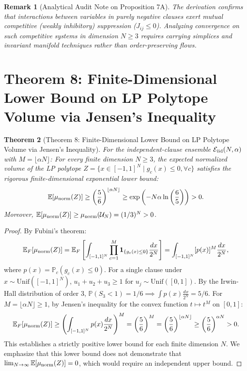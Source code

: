 \documentclass[11pt,a4paper]{article}
\newtheorem{theorem}{Theorem}[section]
\newtheorem{remark}[theorem]{Remark}
\begin{document}
\begin{remark}[Analytical Audit Note on Proposition 7A]
The derivation confirms that interactions between variables in purely negative clauses exert mutual competitive (weakly inhibitory) suppression ($J_{ij} \le 0$). Analyzing convergence on such competitive systems in dimension $N \ge 3$ requires carrying simplices and invariant manifold techniques rather than order-preserving flows.
\end{remark}

\section{Theorem 8: Finite-Dimensional Lower Bound on LP Polytope Volume via Jensen's Inequality}

\begin{theorem}[Theorem 8: Finite-Dimensional Lower Bound on LP Polytope Volume via Jensen's Inequality]
\label{thm:lp_volume}
For the independent-clause ensemble $\mathcal E_{\rm iid}(N,\alpha)$ with $M=\lfloor\alpha N\rfloor$:
For every finite dimension $N \ge 3$, the expected normalized volume of the LP polytope $Z = \{x \in [-1, 1]^N \mid g_c(x) \le 0, \forall c\}$ satisfies the rigorous finite-dimensional exponential lower bound:
\begin{equation}
\mathbb{E}[\mu_{\rm norm}(Z)] \ge \left(\frac{5}{6}\right)^{\lfloor \alpha N \rfloor} \ge \exp\left(-N \alpha \ln\left(\frac{6}{5}\right)\right) > 0.
\end{equation}
Moreover, $\mathbb{E}[\mu_{\rm norm}(Z)] \ge \mu_{\rm norm}(\mathcal{U}_N) = (1/3)^N > 0$.
\end{theorem}

\begin{proof}
By Fubini's theorem:
\begin{equation}
\mathbb{E}_F[\mu_{\rm norm}(Z)] = \mathbb{E}_F \left[ \int_{[-1, 1]^N} \prod_{c=1}^M \mathbf{1}_{\{g_c(x) \le 0\}} \frac{dx}{2^N} \right] = \int_{[-1, 1]^N} [p(x)]^M \frac{dx}{2^N},
\end{equation}
where $p(x) = \mathbb{P}_c(g_c(x) \le 0)$. For a single clause under $x \sim \text{Unif}([-1, 1]^N)$, $u_1 + u_2 + u_3 \ge 1$ for $u_j \sim \text{Unif}([0, 1])$. By the Irwin-Hall distribution of order 3, $\mathbb{P}(S_3 < 1) = 1/6 \implies \int p(x) \frac{dx}{2^N} = 5/6$.
For $M = \lfloor \alpha N \rfloor \ge 1$, by Jensen's inequality for the convex function $t \mapsto t^M$ on $[0, 1]$:
\begin{equation}
\mathbb{E}_F[\mu_{\rm norm}(Z)] \ge \left( \int_{[-1, 1]^N} p(x) \frac{dx}{2^N} \right)^M = \left(\frac{5}{6}\right)^M = \left(\frac{5}{6}\right)^{\lfloor \alpha N \rfloor} \ge \left(\frac{5}{6}\right)^{\alpha N} > 0.
\end{equation}
This establishes a strictly positive lower bound for each finite dimension $N$. We emphasize that this lower bound does not demonstrate that $\lim_{N \to \infty} \mathbb{E}[\mu_{\rm norm}(Z)] = 0$, which would require an independent upper bound.
\end{proof}
\end{document}
